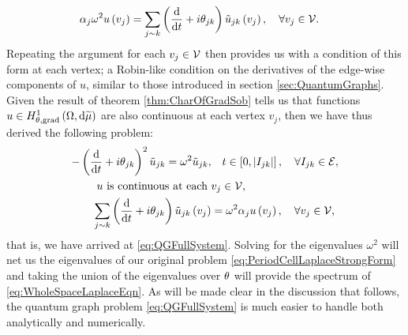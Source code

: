 \begin{align*}
	\alpha_j\omega^2 u\left( v_j \right) &= \sum_{j\sim k}\left( \dfrac{\mathrm{d}}{\mathrm{d}t} + i\theta_{jk} \right)\tilde{u}_{jk}\left( v_j \right), \quad \forall v_j \in \mathcal{V}.
\end{align*}
Repeating the argument for each $v_j\in \mathcal{V}$ then provides us with a condition of this form at each vertex; a Robin-like condition on the derivatives of the edge-wise components of $u$, similar to those introduced in section \ref{sec:QuantumGraphs}.
Given the result of theorem \ref{thm:CharOfGradSob} tells us that functions $u\in H^1_{\theta, \mathrm{grad}}\left( \Omega, \mathrm{d}\widetilde{\mu} \right)$ are also continuous at each vertex $v_j$, then we have thus derived the following problem:
\begin{align*}
	-\left( \dfrac{\mathrm{d}}{\mathrm{d}t} + i\theta_{jk} \right)^2 \tilde{u}_{jk} = \omega^2 \tilde{u}_{jk}, &\quad t\in\left[ 0,\left\lvert I_{jk} \right\rvert \right], \quad \forall I_{jk}\in \mathcal{E}, \\
	u \text{ is continuous at each } &v_j \in \mathcal{V}, \\
	\sum_{j\sim k}\left( \dfrac{\mathrm{d}}{\mathrm{d}t} + i\theta_{jk} \right)\tilde{u}_{jk}\left( v_j \right) &= \omega^2\alpha_{j}u\left( v_j \right),  \quad \forall v_j \in \mathcal{V},
\end{align*}
that is, we have arrived at \eqref{eq:QGFullSystem}.
Solving for the eigenvalues $\omega^2$ will net us the eigenvalues of our original problem \eqref{eq:PeriodCellLaplaceStrongForm} and taking the union of the eigenvalues over $\theta$ will provide the spectrum of \eqref{eq:WholeSpaceLaplaceEqn}.
As will be made clear in the discussion that follows, the quantum graph problem \eqref{eq:QGFullSystem} is much easier to handle both analytically and numerically.
